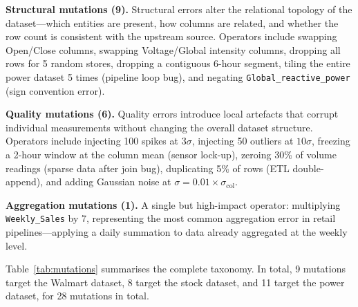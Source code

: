 \documentclass[journal]{IEEEtran}
\begin{document}
\textbf{Structural mutations (9).}  Structural errors alter the relational
topology of the dataset---which entities are present, how columns are
related, and whether the row count is consistent with the upstream source.
Operators include swapping Open/Close columns, swapping Voltage/Global
intensity columns, dropping all rows for 5 random stores, dropping a
contiguous 6-hour segment, tiling the entire power dataset 5 times (pipeline
loop bug), and negating \texttt{Global\_reactive\_power} (sign convention
error).

\textbf{Quality mutations (6).}  Quality errors introduce local artefacts
that corrupt individual measurements without changing the overall dataset
structure.  Operators include injecting 100 spikes at $3\sigma$, injecting
50 outliers at $10\sigma$, freezing a 2-hour window at the column mean
(sensor lock-up), zeroing 30\% of volume readings (sparse data after join
bug), duplicating 5\% of rows (ETL double-append), and adding Gaussian
noise at $\sigma = 0.01 \times \sigma_{\mathrm{col}}$.

\textbf{Aggregation mutations (1).}  A single but high-impact operator:
multiplying \texttt{Weekly\_Sales} by 7, representing the most common
aggregation error in retail pipelines---applying a daily summation to data
already aggregated at the weekly level.

Table~\ref{tab:mutations} summarises the complete taxonomy.  In total, 9
mutations target the Walmart dataset, 8 target the stock dataset, and 11
target the power dataset, for 28 mutations in total.
\end{document}
